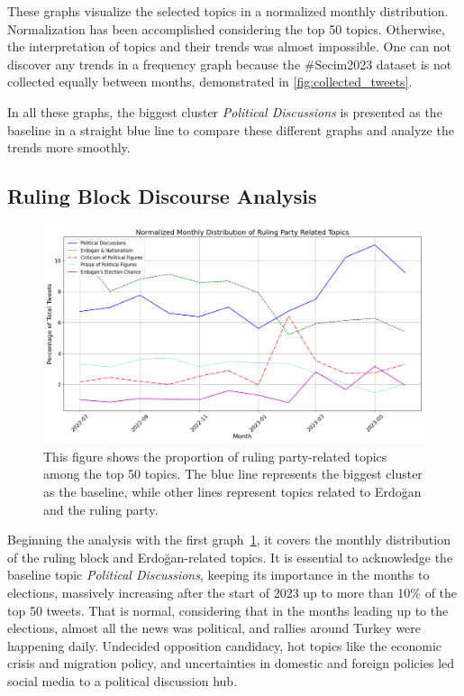 These graphs visualize the selected topics in a normalized monthly distribution. 
Normalization has been accomplished considering the top 50 topics. Otherwise, the interpretation of topics 
and their trends was almost impossible. One can not discover any trends in a frequency graph because 
the \#Secim2023 dataset is not collected equally between months, demonstrated in \autoref{fig:collected_tweets}.

In all these graphs, the biggest cluster \textit{Political Discussions} is presented as the baseline 
in a straight blue line to compare these different graphs and analyze the trends more smoothly. 

\subsection{Ruling Block Discourse Analysis}

\begin{figure}[htb]
    \centering
    \includegraphics[width=\linewidth]{figures/normalized_akp_selected_topics_distribution_with_styles.png}
    \caption[Normalized Monthly Distribution of Ruling Party Related Topics]
    {This figure shows the proportion of ruling party-related topics among the top 50 topics. 
    The blue line represents the biggest cluster as the baseline, while other lines represent topics 
    related to Erdoğan and the ruling party.}\label{fig:topics_graph_akp}
\end{figure}

Beginning the analysis with the first graph~\ref{fig:topics_graph_akp}, 
it covers the monthly distribution of the ruling block and Erdoğan-related topics. 
It is essential to acknowledge the baseline topic \textit{Political Discussions}, 
keeping its importance in the months to elections, massively increasing after the start of 2023 up 
to more than 10\% of the top 50 tweets. That is normal, considering that in the months leading up 
to the elections, almost all the news was political, and rallies around Turkey were happening daily. 
Undecided opposition candidacy, hot topics like the economic crisis and migration policy, and 
uncertainties in domestic and foreign policies led social media to a political discussion hub.

